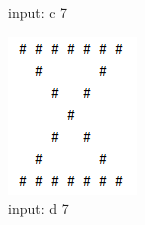 \begin{figure}[H]
\begin{subfigure}{0.19\linewidth}
        \caption{input: c 7}
	\end{subfigure}
    \begin{subfigure}{0.19\linewidth}
		\centering
		\includegraphics[width = 1\linewidth]{../pic/4/4.d.png}
        \caption{input: d 7}
	\end{subfigure}
	\begin{subfigure}{0.19\linewidth}
		\centering

\end{subfigure}
\end{figure}
